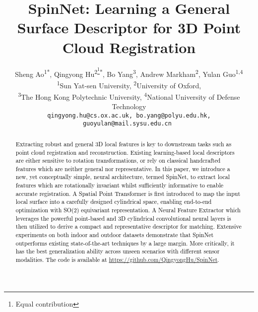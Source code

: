 \documentclass[final]{cvpr}
\newcommand{\qy}[1]{\textcolor{black}{#1}}
\newcommand{\nickname}{SpinNet}
\begin{document}
\title{\nickname{}: Learning a General Surface Descriptor for 3D Point Cloud Registration}




\author{Sheng Ao\textsuperscript{1*}, Qingyong Hu\textsuperscript{2\thanks{Equal contribution}*}, Bo Yang\textsuperscript{3}, Andrew Markham\textsuperscript{2}, 
Yulan Guo\textsuperscript{1,4} \\
\textsuperscript{1}Sun  Yat-sen University, \textsuperscript{2}University of Oxford, \\
\textsuperscript{3}The Hong Kong Polytechnic University, \textsuperscript{4}National University of Defense Technology\\
{\tt\small qingyong.hu@cs.ox.ac.uk, bo.yang@polyu.edu.hk, guoyulan@mail.sysu.edu.cn }}

\maketitle


\begin{abstract}


\qy{Extracting robust and general 3D local features is key to downstream tasks such as point cloud registration and reconstruction. Existing learning-based local descriptors are either sensitive to rotation transformations, or rely on classical handcrafted features which are neither general nor representative. In this paper, we introduce a new, yet conceptually simple, neural architecture, termed \nickname{}, to extract local features which are rotationally invariant whilst sufficiently informative to enable accurate registration. A Spatial Point Transformer is first introduced to map the input local surface into a carefully designed cylindrical space, enabling end-to-end optimization with SO(2) equivariant representation. A Neural Feature Extractor which leverages the powerful point-based and 3D cylindrical convolutional neural layers is then utilized to derive a compact and representative descriptor for matching. Extensive experiments on both indoor and outdoor datasets demonstrate that \nickname{} outperforms existing state-of-the-art techniques by a large margin. More critically, it has the best generalization ability across unseen scenarios with different sensor modalities. The code is available at \url{https://github.com/QingyongHu/SpinNet}.}
\end{abstract}
\end{document}
